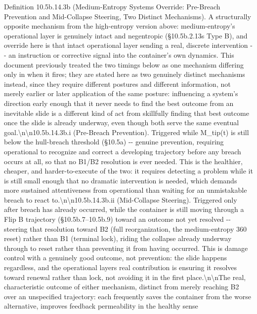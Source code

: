 \documentclass[
]{article}
\begin{document}
Definition 10.5b.14.3b (Medium-Entropy Systems Override: Pre-Breach
Prevention and Mid-Collapse Steering, Two Distinct Mechanisms). A
structurally opposite mechanism from the high-entropy version above:
medium-entropy's operational layer is genuinely intact and negentropic
(§10.5b.2.13s Type B), and override here is that intact operational
layer sending a real, discrete intervention -\/- an instruction or
corrective signal into the container's own dynamics. This document
previously treated the two timings below as one mechanism differing only
in when it fires; they are stated here as two genuinely distinct
mechanisms instead, since they require different postures and different
information, not merely earlier or later application of the same
posture: influencing a system's direction early enough that it never
needs to find the best outcome from an inevitable slide is a different
kind of act from skillfully finding that best outcome once the slide is
already underway, even though both serve the same eventual
goal.\textbackslash n\textbackslash n10.5b.14.3b.i (Pre-Breach
Prevention). Triggered while M\_tip(t) is still below the hull-breach
threshold (§10.5a) -\/- genuine prevention, requiring operational to
recognize and correct a developing trajectory before any breach occurs
at all, so that no B1/B2 resolution is ever needed. This is the
healthier, cheaper, and harder-to-execute of the two: it requires
detecting a problem while it is still small enough that no dramatic
intervention is needed, which demands more sustained attentiveness from
operational than waiting for an unmistakable breach to react
to.\textbackslash n\textbackslash n10.5b.14.3b.ii (Mid-Collapse
Steering). Triggered only after breach has already occurred, while the
container is still moving through a Flip B trajectory
(§10.5b.7--10.5b.9) toward an outcome not yet resolved -\/- steering
that resolution toward B2 (full reorganization, the medium-entropy 360
reset) rather than B1 (terminal lock), riding the collapse already
underway through to reset rather than preventing it from having
occurred. This is damage control with a genuinely good outcome, not
prevention: the slide happens regardless, and the operational layers
real contribution is ensuring it resolves toward renewal rather than
lock, not avoiding it in the first
place.\textbackslash n\textbackslash nThe real, characteristic outcome
of either mechanism, distinct from merely reaching B2 over an
unspecified trajectory: each frequently saves the container from the
worse alternative, improves feedback permeability in the healthy sense
\end{document}
